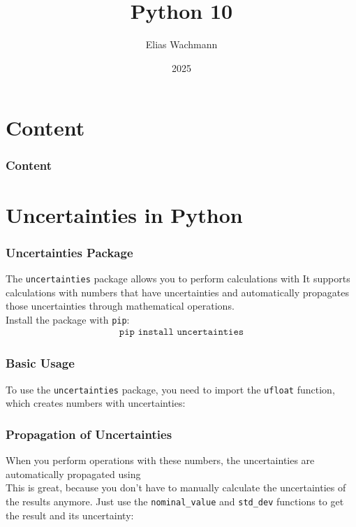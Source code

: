 \documentclass{beamer}
\title[]
{Python 10}
\author[E.~Wachmann]{\scriptsize Elias Wachmann
}
\date{2025} %
\institute[Institute of Theoretical and Computational Physics]
{
}
\begin{document}
\titleframe


\section*{Content}

\begin{frame}
\frametitle{Content}
  \tableofcontents
\end{frame}

\section{Uncertainties in Python}
\begin{frame}
  \frametitle{Uncertainties Package}
  The \texttt{uncertainties} package allows you to perform calculations with 
  It supports calculations with numbers that have uncertainties and automatically propagates those uncertainties through mathematical operations.\\
  \vspace{0.5cm}
  Install the package with \texttt{pip}:
  \begin{align*}
    \texttt{pip install uncertainties}
  \end{align*}
\end{frame}


\begin{frame}
  \frametitle{Basic Usage}
  To use the \texttt{uncertainties} package, you need to import the \texttt{ufloat} function, which creates numbers with uncertainties:
  
\end{frame}

\begin{frame}
  \frametitle{Propagation of Uncertainties}
  When you perform operations with these numbers, the uncertainties are automatically propagated using \\
  \vspace{0.5cm}
  This is great, because you don't have to manually calculate the uncertainties of the results anymore. Just use the \texttt{nominal\_value} and \texttt{std\_dev} functions to get the result and its uncertainty:
\end{frame}
\end{document}
